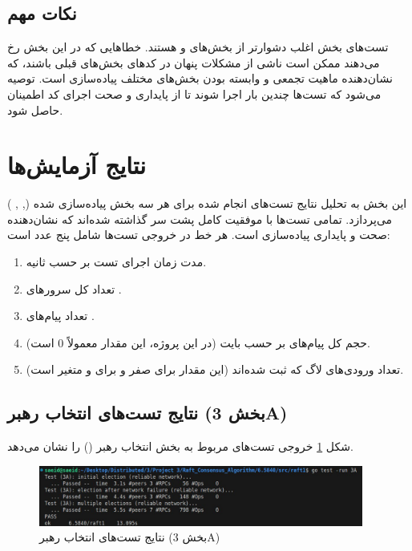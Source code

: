 \documentclass[12pt,a4paper]{article}
\begin{document}
\subsection{نکات مهم}

تست‌های بخش  اغلب دشوارتر از بخش‌های  و  هستند. خطاهایی که در این بخش رخ می‌دهند ممکن است ناشی از مشکلات پنهان در کدهای بخش‌های قبلی باشند، که نشان‌دهنده ماهیت تجمعی و وابسته بودن بخش‌های مختلف پیاده‌سازی  است. توصیه می‌شود که تست‌ها چندین بار اجرا شوند تا از پایداری و صحت اجرای کد اطمینان حاصل شود.

\section{نتایج آزمایش‌ها}

این بخش به تحلیل نتایج تست‌های انجام شده برای هر سه بخش پیاده‌سازی شده  (, , ) می‌پردازد. تمامی تست‌ها با موفقیت کامل پشت سر گذاشته شده‌اند که نشان‌دهنده صحت و پایداری پیاده‌سازی است. هر خط  در خروجی تست‌ها شامل پنج عدد است:
\begin{enumerate}
    \item مدت زمان اجرای تست بر حسب ثانیه.
    \item تعداد کل سرورهای .
    \item تعداد پیام‌های .
    \item حجم کل پیام‌های  بر حسب بایت (در این پروژه، این مقدار معمولاً 0 است).
    \item تعداد ورودی‌های لاگ که ثبت شده‌اند (این مقدار برای  صفر و برای  و  متغیر است).
\end{enumerate}

\subsection{نتایج تست‌های انتخاب رهبر (بخش 3A)}

شکل \ref{fig:3A} خروجی تست‌های مربوط به بخش انتخاب رهبر () را نشان می‌دهد.

\begin{figure}[H]
    \centering
    \includegraphics[width=0.95\textwidth]{3A.jpg}
    \caption{نتایج تست‌های انتخاب رهبر (بخش 3A)}
    \label{fig:3A}
\end{figure}
\end{document}
